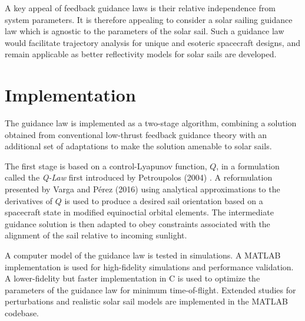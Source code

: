 A key appeal of feedback guidance laws is their relative independence from system parameters. It is therefore appealing to consider a solar sailing guidance law which is agnostic to the parameters of the solar sail. Such a guidance law would facilitate trajectory analysis for unique and esoteric spacecraft designs, and remain applicable as better reflectivity models for solar sails are developed.

\section{Implementation}
The guidance law is implemented as a two-stage algorithm, combining a solution obtained from conventional low-thrust feedback guidance theory with an additional set of adaptations to make the solution amenable to solar sails.

The first stage is based on a control-Lyapunov function, \(Q\), in a formulation called the \textit{Q-Law} first introduced by Petroupolos (2004) \cite{petropoulos2004low}. A reformulation presented by Varga and Pérez (2016) \cite{vargaperez2016} using analytical approximations to the derivatives of \(Q\) is used to produce a desired sail orientation based on a spacecraft state in modified equinoctial orbital elements. The intermediate guidance solution is then adapted to obey constraints associated with the alignment of the sail relative to incoming sunlight.

A computer model of the guidance law is tested in simulations. A MATLAB implementation is used for high-fidelity simulations and performance validation. A lower-fidelity but faster implementation in C is used to optimize the parameters of the guidance law for minimum time-of-flight. Extended studies for perturbations and realistic solar sail models are implemented in the MATLAB codebase.